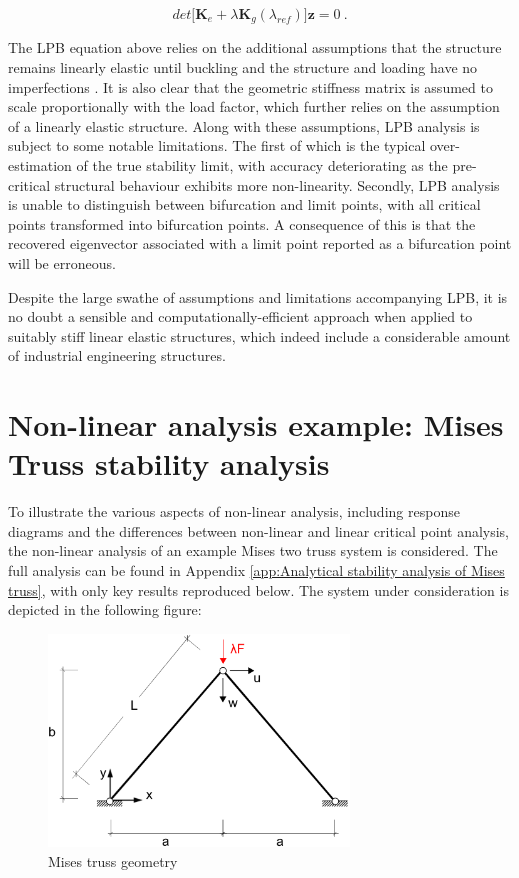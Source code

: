  \begin{equation} 
 det\big[
 \mathbf{K}_e +
{\lambda}
 \mathbf{K}_g(\lambda_{ref})
 \big]\mathbf{z} = 0
 \label{eqstab5}\ .
 \end{equation}
 
 The LPB equation above relies on the additional assumptions that the structure remains linearly elastic until buckling and the structure and loading have no imperfections \cite{FelippaStabilityBasics2016}. It is also clear that the geometric stiffness matrix is assumed to scale proportionally with the load factor, which further relies on the assumption of a linearly elastic structure. Along with these assumptions, LPB analysis is subject to some notable limitations. The first of which is the typical over-estimation of the true stability limit, with accuracy deteriorating as the pre-critical structural behaviour exhibits more non-linearity. Secondly, LPB analysis is unable to distinguish between bifurcation and limit points, with all critical points transformed into bifurcation points. A consequence of this is that the recovered eigenvector associated with a limit point reported as a bifurcation point will be erroneous.
 
 Despite the large swathe of assumptions and limitations accompanying LPB, it is no doubt a sensible and computationally-efficient approach when applied to suitably stiff linear elastic structures, which indeed include a considerable amount of industrial engineering structures.

\section{Non-linear analysis example: Mises Truss stability analysis}

To illustrate the various aspects of non-linear analysis, including response diagrams and the differences between non-linear and linear critical point analysis, the non-linear analysis of an example Mises two truss system is considered. The full analysis can be found in Appendix \ref{app:Analytical stability analysis of Mises truss}, with only key results reproduced below. The system under consideration is depicted in the following figure:

\begin{figure}[H]
	\centering
	\def\svgwidth{\columnwidth}
	\includegraphics[width=8cm]{images/mises_truss_def.png}
	\caption{Mises truss geometry}
	\label{stab2_1}
\end{figure}

